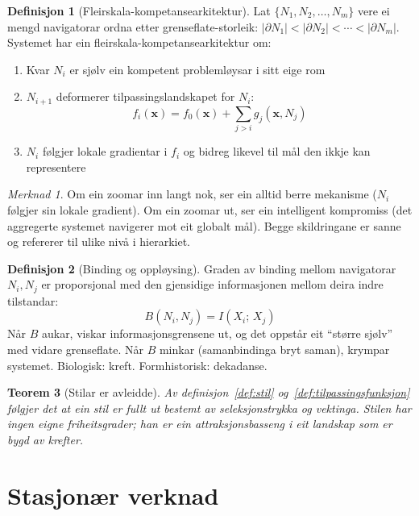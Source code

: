 \documentclass[11pt, a4paper]{article}
\theoremstyle{definition}
\newtheorem{defn}{Definisjon}[section]
\theoremstyle{plain}
\newtheorem{teorem}[defn]{Teorem}
\theoremstyle{remark}
\newtheorem*{merknad}{Merknad}
\newcommand{\x}{\mathbf{x}}
\begin{document}
\begin{defn}[Fleirskala-kompetansearkitektur]
\label{def:fleirskala}
Lat $\{N_1, N_2, \ldots, N_m\}$ vere ei mengd navigatorar ordna etter
grenseflate-storleik: $|\partial N_1| < |\partial N_2| < \cdots < |\partial N_m|$.
Systemet har ein fleirskala-kompetansearkitektur om:
\begin{enumerate}[label=(\roman*)]
  \item Kvar $N_i$ er sj\o lv ein kompetent probleml\o ysar i sitt eige rom
  \item $N_{i+1}$ deformerer tilpassingslandskapet for $N_i$:
    \[
      f_i(\x) = f_0(\x) + \sum_{j > i} g_j(\x, N_j)
    \]
  \item $N_i$ f\o lgjer lokale gradientar i $f_i$ og bidreg likevel til m\aa l den ikkje
        kan representere
\end{enumerate}
\end{defn}

\begin{merknad}
Om ein zoomar inn langt nok, ser ein alltid berre mekanisme ($N_i$ f\o lgjer sin lokale
gradient). Om ein zoomar ut, ser ein intelligent kompromiss (det aggregerte systemet
navigerer mot eit globalt m\aa l). Begge skildringane er sanne og refererer til ulike
niv\aa{} i hierarkiet.
\end{merknad}

\begin{defn}[Binding og oppl\o ysing]
\label{def:binding}
Graden av binding mellom navigatorar $N_i, N_j$ er proporsjonal med den gjensidige
informasjonen mellom deira indre tilstandar:
\[
  B(N_i, N_j) = I(X_i;\, X_j)
\]
N\aa r $B$ aukar, viskar informasjonsgrensene ut, og det oppst\aa r eit ``st\o rre sj\o lv''
med vidare grenseflate. N\aa r $B$ minkar (samanbindinga bryt saman), krympar systemet.
Biologisk: kreft. Formhistorisk: dekadanse.
\end{defn}

\begin{teorem}[Stilar er avleidde]
\label{teo:stilar-avleidde}
Av definisjon~\ref{def:stil} og~\ref{def:tilpassingsfunksjon} f\o lgjer det at ein
stil er fullt ut bestemt av seleksjonstrykka og vektinga. Stilen har ingen eigne
friheitsgrader; han er ein attraksjonsbasseng i eit landskap som er bygd av krefter.
\end{teorem}


\section{Stasjon\ae r verknad}
\label{sec:verknad}
\end{document}
